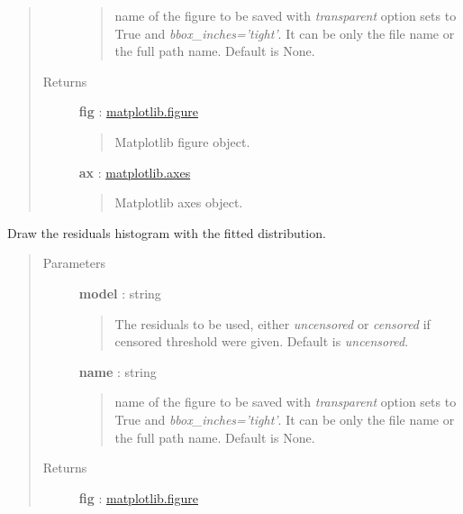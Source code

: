 \documentclass[letterpaper,10pt,english]{sphinxmanual}
\begin{document}
\begin{fulllineitems}
\begin{fulllineitems}
\begin{quote}
\begin{description}
\begin{quote}
name of the figure to be saved with \emph{transparent} option sets to True
and \emph{bbox\_inches='tight'}. It can be only the file name or the 
full path name. Default is None.
\end{quote}

\item[{Returns}] \leavevmode
\textbf{fig} : \href{http://matplotlib.org/api/figure\_api.html}{matplotlib.figure}
\begin{quote}

Matplotlib figure object.
\end{quote}

\textbf{ax} : \href{http://matplotlib.org/api/axes\_api.html}{matplotlib.axes}
\begin{quote}

Matplotlib axes object.
\end{quote}

\end{description}\end{quote}

\end{fulllineitems}


\begin{fulllineitems}
\label{_generated/otpod.UnivariateLinearModelAnalysis:otpod.UnivariateLinearModelAnalysis.drawResidualsDistribution}
Draw the residuals histogram with the fitted distribution.
\begin{quote}\begin{description}
\item[{Parameters}] \leavevmode
\textbf{model} : string
\begin{quote}

The residuals to be used, either \emph{uncensored} or
\emph{censored} if censored threshold were given. Default is \emph{uncensored}.
\end{quote}

\textbf{name} : string
\begin{quote}

name of the figure to be saved with \emph{transparent} option sets to True
and \emph{bbox\_inches='tight'}. It can be only the file name or the 
full path name. Default is None.
\end{quote}

\item[{Returns}] \leavevmode
\textbf{fig} : \href{http://matplotlib.org/api/figure\_api.html}{matplotlib.figure}
\begin{quote}


\end{quote}
\end{description}
\end{quote}
\end{fulllineitems}
\end{fulllineitems}
\end{document}
